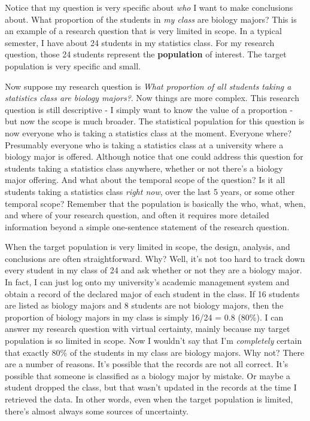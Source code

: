 \documentclass[
]{book}
\begin{document}
Notice that my question is very specific about \emph{who} I want to make conclusions about. What proportion of the students in \emph{my class} are biology majors? This is an example of a research question that is very limited in scope. In a typical semester, I have about 24 students in my statistics class. For my research question, those 24 students represent the \textbf{population} of interest. The target population is very specific and small.

Now suppose my research question is \emph{What proportion of all students taking a statistics class are biology majors?}. Now things are more complex. This research question is still descriptive - I simply want to know the value of a proportion - but now the scope is much broader. The statistical population for this question is now everyone who is taking a statistics class at the moment. Everyone where? Presumably everyone who is taking a statistics class at a university where a biology major is offered. Although notice that one could address this question for students taking a statistics class anywhere, whether or not there's a biology major offering. And what about the temporal scope of the question? Is it all students taking a statistics class \emph{right now}, over the last 5 years, or some other temporal scope? Remember that the population is basically the who, what, when, and where of your research question, and often it requires more detailed information beyond a simple one-sentence statement of the research question.

When the target population is very limited in scope, the design, analysis, and conclusions are often straightforward. Why? Well, it's not too hard to track down every student in my class of 24 and ask whether or not they are a biology major. In fact, I can just log onto my university's academic management system and obtain a record of the declared major of each student in the class. If 16 students are listed as biology majors and 8 students are not biology majors, then the proportion of biology majors in my class is simply 16/24 = 0.8 (80\%). I can answer my research question with virtual certainty, mainly because my target population is so limited in scope. Now I wouldn't say that I'm \emph{completely} certain that exactly 80\% of the students in my class are biology majors. Why not? There are a number of reasons. It's possible that the records are not all correct. It's possible that someone is classified as a biology major by mistake. Or maybe a student dropped the class, but that wasn't updated in the records at the time I retrieved the data. In other words, even when the target population is limited, there's almost always some sources of uncertainty.
\end{document}
